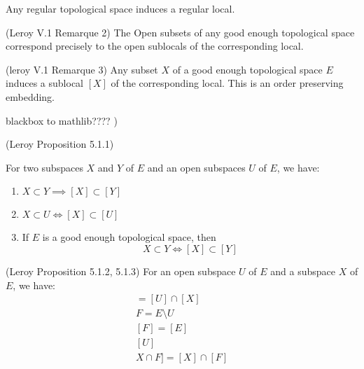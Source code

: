 \begin{lemma}
    \label{lem:regular_top_to_regular_local}
    Any regular topological space induces a regular local.
\end{lemma}

\begin{lemma}[Opens]
(Leroy V.1 Remarque 2)
    \label{lem:opens_correspond}
    The Open subsets of any good enough topological space correspond precisely to the open sublocals of the corresponding local.
\end{lemma}

\begin{lemma}
(leroy V.1 Remarque 3)
    \label{lem:subset_sublocal}
    Any subset $X$ of a good enough topological space $E$ induces a sublocal $[X]$ of the corresponding local. This is an order preserving embedding.
\end{lemma}

\begin{definition}
    \label{def:good_enough_topological_space}
    blackbox to mathlib???? )
\end{definition}

\begin{lemma}
(Leroy Proposition 5.1.1)
    \label{lem:subset_to_sublocal_part_1}

    For two subspaces $X$ and $Y$ of $E$ and an open subspaces $U$ of $E$, we have:
    \begin{enumerate}
        \item $X \subset Y \implies [X] \subset [Y]$
        \item $X \subset U \iff [X] \subset [U]$
        \item If $E$ is a good enough topological space, then \[X \subset Y \iff [X] \subset [Y]\]
    \end{enumerate}
\end{lemma}

\begin{lemma}
(Leroy Proposition 5.1.2, 5.1.3)
    \label{lem:subset_to_sublocal_part_2}
    For an open subspace $U$ of $E$ and a subspace $X$ of $E$, we have:
    \begin{gather*}
    [U \cap X]
        = [U] \cap [X]\\
        F = E \setminus U\\
        [F] = [E] \\ [U]\\
        X \cap F] = [X] \cap [F]\\
    \end{gather*}

\end{lemma}

